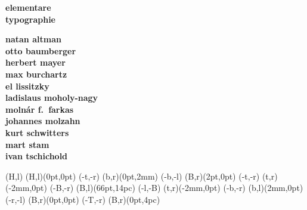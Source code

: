 \documentclass{article}
\begin{document}
  \NewCoffin \result
  \NewCoffin \aaa
  \NewCoffin \bbb
  \NewCoffin \ccc
  \NewCoffin \ddd
  \NewCoffin \eee
  \NewCoffin \fff
  \NewCoffin {}
  \NewCoffin {}
  \NewCoffin {}

\SetHorizontalCoffin \result {}
\SetHorizontalCoffin {}
\SetHorizontalCoffin {}
\SetHorizontalCoffin {}
\SetHorizontalCoffin {}
\SetVerticalCoffin \eee {180pt}
                 {\raggedleft\fontsize{31}{36}\sffamily\bfseries 
                      elementare\\
                      typographie}
\SetVerticalCoffin \fff {140pt}
                 {\raggedright \fontsize{13}{14}\sffamily\bfseries 
                       natan altman \\
                       otto baumberger \\
                       herbert mayer \\
                       max burchartz \\
                       el lissitzky \\
                       ladislaus moholy-nagy \\
                       moln\'ar f.~farkas \\
                       johannes molzahn \\
                       kurt schwitters \\
                       mart stam \\
                       ivan tschichold}
     
\RotateCoffin {}
\RotateCoffin {}

\SetHorizontalCoffin {}
\SetHorizontalCoffin {}
\SetHorizontalCoffin {}


\JoinCoffins \result (H,l)          \aaa (H,l)(0pt,0pt) 
\JoinCoffins \result(\aaa-t,\aaa-r) (b,r)(0pt,2mm)
\JoinCoffins \result(\aaa-b,\aaa-l) \bbb(B,r)(2pt,0pt)
\JoinCoffins \result(\bbb-t,\bbb-r) (t,r)(-2mm,0pt)
\JoinCoffins \result(\aaa-B,\aaa-r) \ccc(B,l)(66pt,14pc)
\JoinCoffins \result(\bbb-l,\ccc-B) \fff(t,r)(-2mm,0pt)
\JoinCoffins \result(\fff-b,\fff-r) (b,l)(2mm,0pt)
\JoinCoffins \result(\ccc-r,\fff-l) \eee(B,r)(0pt,0pt)
\JoinCoffins \result(\eee-T,\eee-r) \ddd(B,r)(0pt,4pc)
\end{document}
